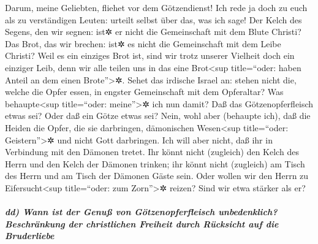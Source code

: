  Darum, meine Geliebten, fliehet vor dem Götzendienst!
 Ich rede ja doch zu euch als zu verständigen Leuten:
urteilt selbst über das, was ich sage!  Der Kelch des
Segens, den wir segnen: ist✲ er nicht die Gemeinschaft mit dem Blute
Christi? Das Brot, das wir brechen: ist✲ es nicht die Gemeinschaft mit
dem Leibe Christi?  Weil es ein einziges Brot ist, sind
wir trotz unserer Vielheit doch ein einziger Leib, denn wir alle teilen
uns in das eine Brot\textless sup title=``oder: haben Anteil an dem
einen Brote''\textgreater✲.  Sehet das irdische Israel
an: stehen nicht die, welche die Opfer essen, in engster Gemeinschaft
mit dem Opferaltar?  Was behaupte\textless sup
title=``oder: meine''\textgreater✲ ich nun damit? Daß das
Götzenopferfleisch etwas sei? Oder daß ein Götze etwas sei?
 Nein, wohl aber (behaupte ich), daß die Heiden die
Opfer, die sie darbringen, dämonischen Wesen\textless sup title=``oder:
Geistern''\textgreater✲ und nicht Gott darbringen. Ich will aber nicht,
daß ihr in Verbindung mit den Dämonen tretet.  Ihr könnt
nicht (zugleich) den Kelch des Herrn und den Kelch der Dämonen trinken;
ihr könnt nicht (zugleich) am Tisch des Herrn und am Tisch der Dämonen
Gäste sein.  Oder wollen wir den Herrn zu
Eifersucht\textless sup title=``oder: zum Zorn''\textgreater✲ reizen?
Sind wir etwa stärker als er?

\hypertarget{dd-wann-ist-der-genuuxdf-von-guxf6tzenopferfleisch-unbedenklich-beschruxe4nkung-der-christlichen-freiheit-durch-ruxfccksicht-auf-die-bruderliebe}{%
\subparagraph{dd) Wann ist der Genuß von Götzenopferfleisch
unbedenklich? Beschränkung der christlichen Freiheit durch Rücksicht auf
die
Bruderliebe}\label{dd-wann-ist-der-genuuxdf-von-guxf6tzenopferfleisch-unbedenklich-beschruxe4nkung-der-christlichen-freiheit-durch-ruxfccksicht-auf-die-bruderliebe}}

